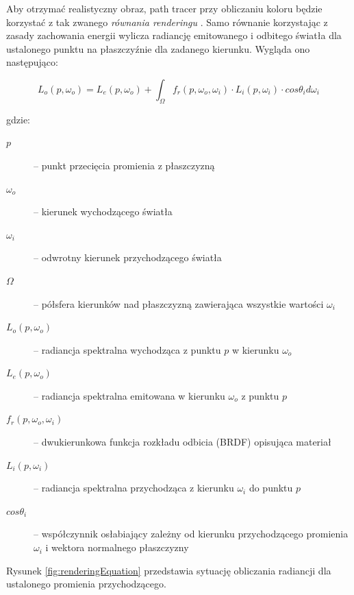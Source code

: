 \documentclass[inz,shortabstract]{iithesis}
\begin{document}
        Aby otrzymać realistyczny obraz, path tracer przy obliczaniu koloru będzie korzystać z tak zwanego \textit{równania renderingu} \cite{pbrt}. Samo równanie korzystając z zasady zachowania energii wylicza radiancję emitowanego i odbitego światła dla ustalonego punktu na płaszczyźnie dla zadanego kierunku. Wygląda ono następująco:
        
        \begin{equation*}
            L_o(p, \omega_o) = L_e(p, \omega_o) + \int_{\Omega} f_r(p, \omega_o, \omega_i) \cdot L_i(p, \omega_i) \cdot cos\theta_i d\omega_i
        \end{equation*}
        
        gdzie:
        
        \begin{description}
            \item[$p$] -- punkt przecięcia promienia z płaszczyzną
            \item[$\omega_o$] -- kierunek wychodzącego światła
            \item[$\omega_i$] -- odwrotny kierunek przychodzącego światła
            \item[$\Omega$] -- półsfera kierunków nad płaszczyzną zawierająca wszystkie wartości $\omega_i$ 
            \item[$L_o(p, \omega_o)$] -- radiancja spektralna wychodząca z punktu $p$ w kierunku $\omega_o$
            \item[$L_e(p, \omega_o)$] -- radiancja spektralna emitowana w kierunku $\omega_o$ z punktu $p$  
            \item[$f_r(p, \omega_o, \omega_i)$] -- dwukierunkowa funkcja rozkładu odbicia (BRDF) opisująca materiał
            \item[$L_i(p, \omega_i)$] -- radiancja spektralna przychodząca z kierunku $\omega_i$ do punktu $p$
            \item[$cos\theta_i$] -- współczynnik osłabiający zależny od kierunku przychodzącego promienia $\omega_i$ i wektora normalnego płaszczyzny
        \end{description}

        Rysunek \ref{fig:renderingEquation} przedstawia sytuację obliczania radiancji dla ustalonego promienia przychodzącego.
        
\end{document}
